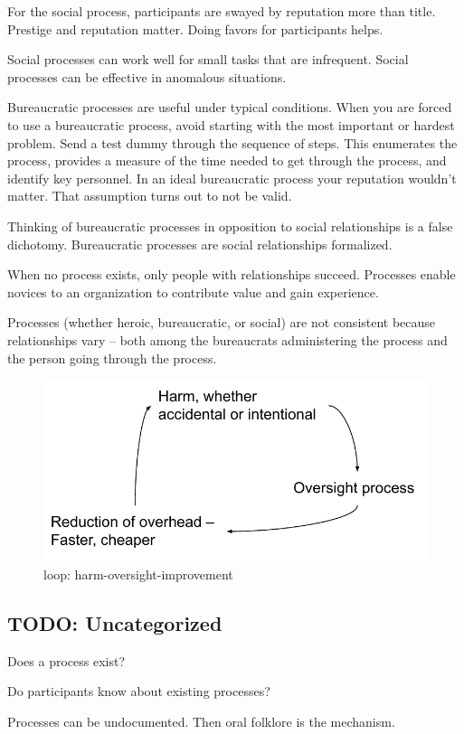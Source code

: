 For the social process, participants are swayed by reputation more than title. Prestige and reputation matter. Doing favors for participants helps.

Social processes can work well for small tasks that are infrequent.
Social processes can be effective in anomalous situations.

Bureaucratic processes are useful under typical conditions.
When you are forced to use a bureaucratic process, avoid starting with the most important or hardest problem. Send a test dummy through the sequence of steps. This enumerates the process, provides a measure of the time needed to get through the process, and identify key personnel. In an ideal bureaucratic process your reputation wouldn't matter. That assumption turns out to not be valid. 

Thinking of bureaucratic processes in opposition to social relationships is a false dichotomy. Bureaucratic processes are social relationships formalized.



When no process exists, only people with relationships succeed. Processes enable novices to an organization to contribute value and gain experience. 



Processes (whether heroic, bureaucratic, or social) are not consistent because relationships vary -- both among the bureaucrats administering the process and the person going through the process.






\begin{figure}
    \centering
    \includegraphics{images/process_loop_harm-oversight-improvement}
    \caption{loop: harm-oversight-improvement}
    \label{fig:harm-oversight-improvement}
\end{figure}








\subsection{TODO: Uncategorized}

Does a process exist?

Do participants know about existing processes?

Processes can be undocumented. Then oral folklore is the mechanism. 


